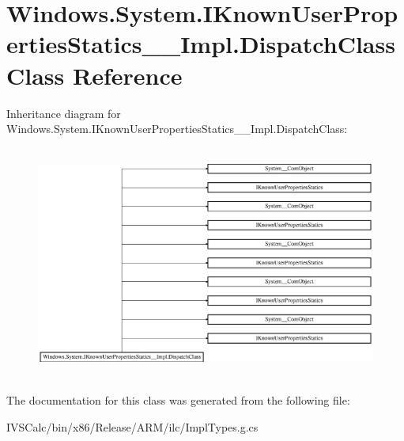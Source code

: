 \hypertarget{class_windows_1_1_system_1_1_i_known_user_properties_statics_____impl_1_1_dispatch_class}{}\section{Windows.\+System.\+I\+Known\+User\+Properties\+Statics\+\_\+\+\_\+\+Impl.\+Dispatch\+Class Class Reference}
\label{class_windows_1_1_system_1_1_i_known_user_properties_statics_____impl_1_1_dispatch_class}
Inheritance diagram for Windows.\+System.\+I\+Known\+User\+Properties\+Statics\+\_\+\+\_\+\+Impl.\+Dispatch\+Class\+:\begin{figure}[H]
\begin{center}
\leavevmode
\includegraphics[height=7.700000cm]{class_windows_1_1_system_1_1_i_known_user_properties_statics_____impl_1_1_dispatch_class}
\end{center}
\end{figure}


The documentation for this class was generated from the following file\+:\begin{DoxyCompactItemize}
\item 
I\+V\+S\+Calc/bin/x86/\+Release/\+A\+R\+M/ilc/Impl\+Types.\+g.\+cs\end{DoxyCompactItemize}
